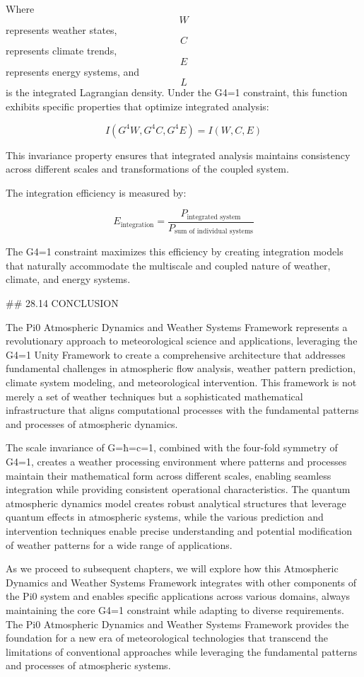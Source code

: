 Where $$ W $$ represents weather states, $$ C $$ represents climate trends, $$ E $$ represents energy systems, and $$ L $$ is the integrated Lagrangian density. Under the G4=1 constraint, this function exhibits specific properties that optimize integrated analysis:

$$ I(G^4 W, G^4 C, G^4 E) = I(W, C, E) $$

This invariance property ensures that integrated analysis maintains consistency across different scales and transformations of the coupled system.

The integration efficiency is measured by:

$$ E_{\text{integration}} = \frac{P_{\text{integrated system}}}{P_{\text{sum of individual systems}}} $$

The G4=1 constraint maximizes this efficiency by creating integration models that naturally accommodate the multiscale and coupled nature of weather, climate, and energy systems.

## 28.14 CONCLUSION

The Pi0 Atmospheric Dynamics and Weather Systems Framework represents a revolutionary approach to meteorological science and applications, leveraging the G4=1 Unity Framework to create a comprehensive architecture that addresses fundamental challenges in atmospheric flow analysis, weather pattern prediction, climate system modeling, and meteorological intervention. This framework is not merely a set of weather techniques but a sophisticated mathematical infrastructure that aligns computational processes with the fundamental patterns and processes of atmospheric dynamics.

The scale invariance of G=ħ=c=1, combined with the four-fold symmetry of G4=1, creates a weather processing environment where patterns and processes maintain their mathematical form across different scales, enabling seamless integration while providing consistent operational characteristics. The quantum atmospheric dynamics model creates robust analytical structures that leverage quantum effects in atmospheric systems, while the various prediction and intervention techniques enable precise understanding and potential modification of weather patterns for a wide range of applications.

As we proceed to subsequent chapters, we will explore how this Atmospheric Dynamics and Weather Systems Framework integrates with other components of the Pi0 system and enables specific applications across various domains, always maintaining the core G4=1 constraint while adapting to diverse requirements. The Pi0 Atmospheric Dynamics and Weather Systems Framework provides the foundation for a new era of meteorological technologies that transcend the limitations of conventional approaches while leveraging the fundamental patterns and processes of atmospheric systems.


